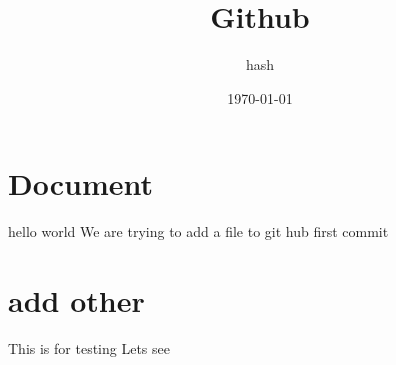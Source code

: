 \documentclass{report}
\title{Github}
\author{hash}
\date{\today}
\begin{document}
\maketitle
\section{Document}

hello world
We are trying to add a file to git hub
first commit


\section{add other}

This is for testing
Lets see
\end{document}
